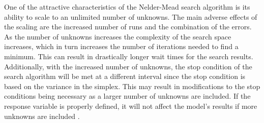 \label{sensetivity_results}

One of the attractive characteristics of the Nelder-Mead search algorithm is its ability to scale to an unlimited number of unknowns.  The main adverse effects of the scaling are the increased number of runs and the combination of the errors.  As the number of unknowns increases the complexity of the search space increases, which in turn increases the number of iterations needed to find a minimum.  This can result in drastically longer wait times for the search results.  Additionally, with the increased number of unknowns, the stop condition of the search algorithm will be met at a different interval since the stop condition is based on the variance in the simplex.  This may result in modifications to the stop conditions being necessary as a larger number of unknowns are included.  If the response variable is properly defined, it will not affect the model's results if more unknowns are included \cite{wang_2011}.

